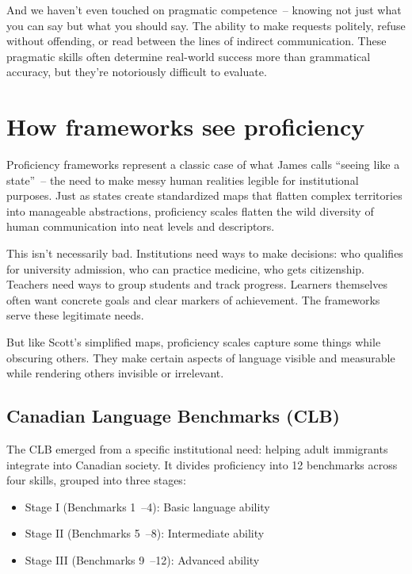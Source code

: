 And we haven't even touched on pragmatic competence~-- knowing not just what you can say but what you should say. The ability to make requests politely, refuse without offending, or read between the lines of indirect communication. These pragmatic skills often determine real-world success more than grammatical accuracy, but they're notoriously difficult to evaluate.

\section{How frameworks see proficiency}

Proficiency frameworks represent a classic case of what James \textcite{scott1998} calls ``seeing like a state''~-- the need to make messy human realities legible for institutional purposes. Just as states create standardized maps that flatten complex territories into manageable abstractions, proficiency scales flatten the wild diversity of human communication into neat levels and descriptors.

This isn't necessarily bad. Institutions need ways to make decisions: who qualifies for university admission, who can practice medicine, who gets citizenship. Teachers need ways to group students and track progress. Learners themselves often want concrete goals and clear markers of achievement. The frameworks serve these legitimate needs.

But like Scott's simplified maps, proficiency scales capture some things while obscuring others. They make certain aspects of language visible and measurable while rendering others invisible or irrelevant.

\subsection{Canadian Language Benchmarks (CLB)}

The CLB emerged from a specific institutional need: helping adult immigrants integrate into Canadian society. It divides proficiency into 12 benchmarks across four skills, grouped into three stages:

\begin{itemize}[noitemsep]
\item Stage I (Benchmarks 1~--4): Basic language ability
\item Stage II (Benchmarks 5~--8): Intermediate ability  
\item Stage III (Benchmarks 9~--12): Advanced ability
\end{itemize}

